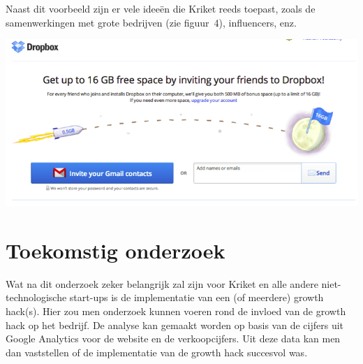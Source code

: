 \documentclass[a0,portrait]{a0poster}
\begin{document}
\begin{multicols}{2}
Naast dit voorbeeld zijn er vele ideeën die Kriket reeds toepast, zoals de samenwerkingen met grote bedrijven (zie figuur~4), influencers, enz.

\begin{center}
	\vspace{1cm}
	\includegraphics[width=1.0\linewidth]{dropbox-referral}
\end{center}

\color{HoGentAccent1} 
\section*{Toekomstig onderzoek}
\color{black}

Wat na dit onderzoek zeker belangrijk zal zijn voor Kriket en alle andere niet-technologische start-ups is de implementatie van een (of meerdere) growth hack(s). Hier zou men onderzoek kunnen voeren rond de invloed van de growth hack op het bedrijf. De analyse kan gemaakt worden op basis van de cijfers uit Google Analytics voor de website en de verkoopcijfers. Uit deze data kan men dan vaststellen of de implementatie van de growth hack succesvol was.


\end{multicols}
\end{document}
